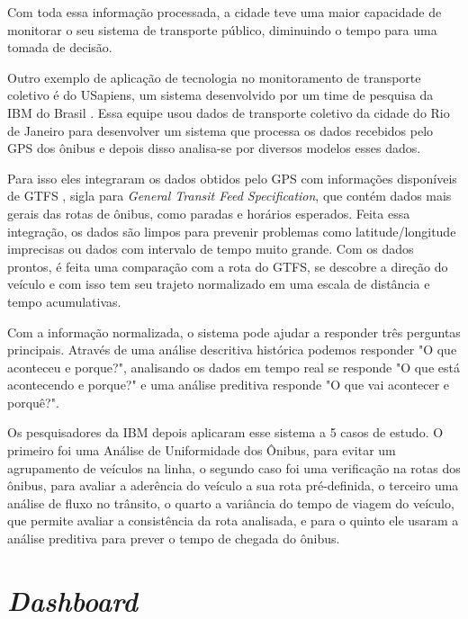 \par Com toda essa informação processada, a cidade teve uma maior capacidade de monitorar o seu sistema de transporte público, diminuindo o tempo para uma tomada de decisão.

\par Outro exemplo de aplicação de tecnologia no monitoramento de transporte coletivo é do USapiens, um sistema desenvolvido por um time de pesquisa da IBM do Brasil \cite{Vieira2015}. Essa equipe usou dados de transporte coletivo da cidade do Rio de Janeiro para desenvolver um sistema que processa os dados recebidos pelo GPS dos ônibus e depois disso analisa-se por diversos modelos esses dados.

\par Para isso eles integraram os dados obtidos pelo GPS com informações disponíveis de GTFS \cite{GTFS}, sigla para \textit{General Transit Feed Specification}, que contém dados mais gerais das rotas de ônibus, como paradas e horários esperados. Feita essa integração, os dados são limpos para prevenir problemas como latitude/longitude imprecisas ou dados com intervalo de tempo muito grande. Com os dados prontos, é feita uma comparação com a rota do GTFS, se descobre a direção do veículo e com isso tem seu trajeto normalizado em uma escala de distância e tempo acumulativas.

\par Com a informação normalizada, o sistema pode ajudar a responder três perguntas principais. Através de uma análise descritiva histórica podemos responder "O que aconteceu e porque?", analisando os dados em tempo real se responde "O que está acontecendo e porque?" e uma análise preditiva responde "O que vai acontecer e porquê?".

\par Os pesquisadores da IBM depois aplicaram esse sistema a 5 casos de estudo. O primeiro foi uma Análise de Uniformidade dos Ônibus, para evitar um agrupamento de veículos na linha, o segundo caso foi uma verificação na rotas dos ônibus, para avaliar a aderência do veículo a sua rota pré-definida, o terceiro uma análise de fluxo no trânsito, o quarto a variância do tempo de viagem do veículo, que permite avaliar a consistência da rota analisada, e para o quinto ele usaram a análise preditiva para prever o tempo de chegada do ônibus.

\section{\textit{Dashboard}}

